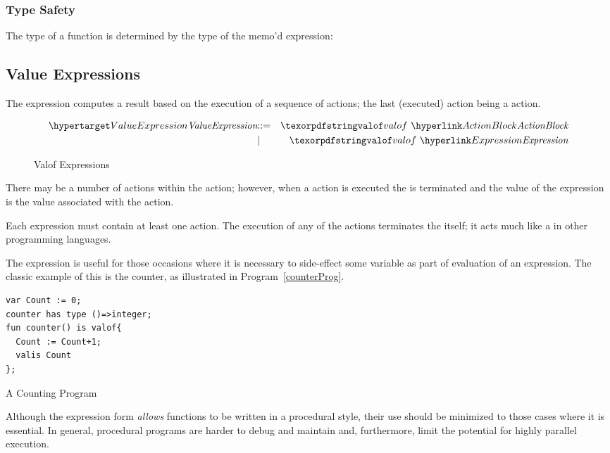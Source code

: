 \subsubsection{Type Safety}
The type of a  function is determined by the type of the memo'd expression:

\begin{prooftree}
\end{prooftree}

\subsection{Value Expressions}
\label{valueExpression}

The  expression computes a result based on the execution of a sequence of actions; the last (executed) action being a  action.

\begin{figure}[htbp]
\begin{eqnarray*}
\ntDef{ValueExpression}&\arrow&\q{valof}\ \ntRef{ActionBlock}\\
&\choice&\q{valof}\ \ntRef{Expression}
\end{eqnarray*}
\caption{Valof Expressions}
\label{valueExpressionFig}
\end{figure}

There may be a number of actions within the  action; however, when a  action is executed the  is terminated and the value of the  expression is the value associated with the  action.

\begin{aside}
Each  expression must contain at least one  action. The execution of any of the  actions terminates the  itself; it acts much like a  in other programming languages.
\end{aside}

The  expression is useful for those occasions where it is necessary to side-effect some variable as part of evaluation of an expression. The classic example of this is the counter, as illustrated in Program~\vref{counterProg}.
\begin{program}
\begin{lstlisting}
var Count := 0;
counter has type ()=>integer;
fun counter() is valof{
  Count := Count+1;
  valis Count
};
\end{lstlisting}
\caption{A Counting Program\label{counterProg}}
\end{program}
\begin{aside}
Although the  expression form \emph{allows} functions to be written in a procedural style, their use should be minimized to those cases where it is essential. In general, procedural programs are harder to debug and maintain and, furthermore, limit the potential for highly parallel execution.
\end{aside}

